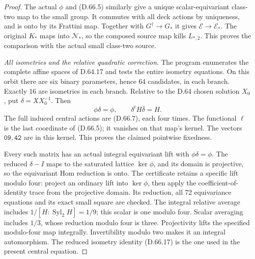 \begin{proof}
The actual \(\phi\) and (D.66.5) similarly give a
unique scalar-equivariant class-two map to the small
group. It commutes with all deck actions by uniqueness,
and is onto by its Frattini map. Together with
\(G^\dagger\to G_*\) it gives \(\mathscr E\to\mathscr E_*\).
The original \(K_*\) maps into \(\mathscr N_*\), so
the composed source map kills \(L_{*,2}\). This proves
the comparison with the actual small class-two source.

\emph{All isometries and the relative quadratic correction.}
The program  enumerates
the complete affine spaces of D.64.17 and tests the entire
isometry equations. On this orbit there are six binary
parameters, hence 64 candidates, in each branch. Exactly
16 are isometries in each branch. Relative to the D.64
chosen solution \(X_0\), put \(\delta=X X_0^{-1}\). Then
\[
             \phi\delta=\phi,\qquad
             \delta^t H\bar\delta=H.
 \tag{D.66.17}
\]
The full induced central actions are (D.66.7), each four
times. The functional \(\ell\) is the last coordinate
of (D.66.5); it vanishes on that map's kernel. The
vectors \(\mathtt{09},\mathtt{42}\) are in this kernel.
This proves the claimed pointwise fixedness.

Every such matrix has an actual integral equivariant
lift with \(\phi\delta=\phi\). The reduced
\(\delta-I\) maps to the saturated lattice
\(\ker\phi\), and its domain is projective, so the
equivariant Hom reduction is onto. The certificate
retains a specific lift modulo four: project an
ordinary lift into \(\ker\phi\), then apply the
coefficient-of-identity trace from the projective
domain. Its reduction, all 72 equivariance equations
and its exact small square are checked. The integral
relative average includes \(1/[H:\operatorname{Syl}_2H]=1/9\);
this scalar is one modulo four. Scalar averaging includes
\(1/3\), whose reduction modulo four is three.
Projectivity lifts the specified modulo-four map
integrally. Invertibility modulo two makes it an
integral automorphism. The reduced isometry identity
(D.66.17) is the one used in the present central equation.


\end{proof}
